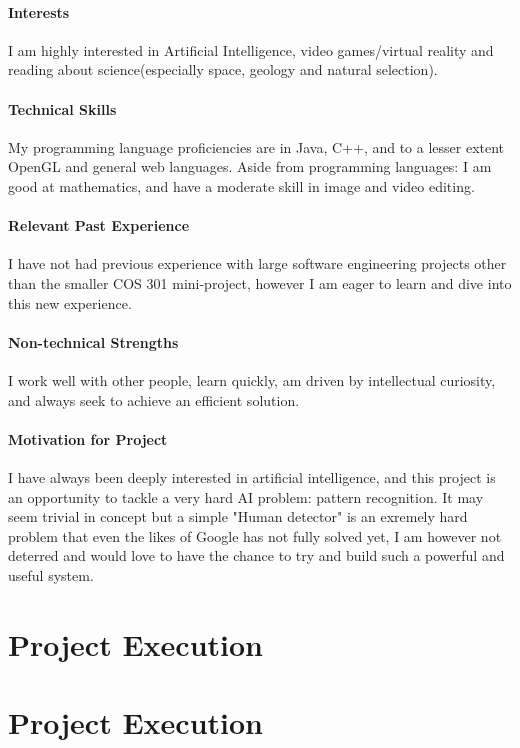 \documentclass[12pt]{article}
\begin{document}
\paragraph{Interests}
I am highly interested in Artificial Intelligence, video games/virtual reality and reading about science(especially space, geology and natural selection).
\paragraph{Technical Skills}
My programming language proficiencies are in Java, C++, and to a lesser extent OpenGL and general web languages.
Aside from programming languages: I am good at mathematics, and have a moderate skill in image and video editing.
\paragraph{Relevant Past Experience}
I have not had previous experience with large software engineering projects other than the smaller COS 301 mini-project, however I am
eager to learn and dive into this new experience.
\paragraph{Non-technical Strengths}
I work well with other people, learn quickly, am driven by intellectual curiosity, and always seek to achieve an efficient solution.
\paragraph{Motivation for Project}
I have always been deeply interested in artificial intelligence, and this project is an opportunity to tackle a very hard AI problem: pattern recognition. It may seem trivial in concept but a simple "Human detector" is an exremely hard problem that even the likes of Google has not fully solved yet, I am however not deterred and would love to have the chance to try and build such a powerful and useful system.

\section{Project Execution}
\section{Project Execution}
\end{document}
